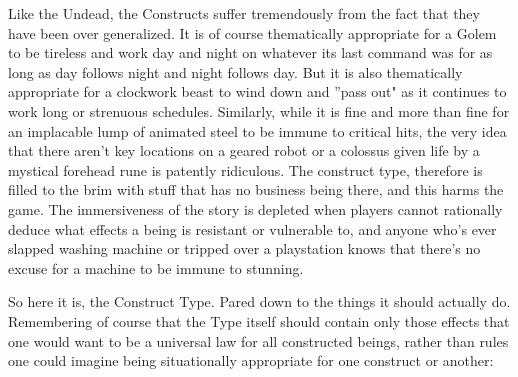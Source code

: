 Like the Undead, the Constructs suffer tremendously from the fact that they have been over generalized. It is of course thematically appropriate for a Golem to be tireless and work day and night on whatever its last command was for as long as day follows night and night follows day. But it is also thematically appropriate for a clockwork beast to wind down and ''pass out" as it continues to work long or strenuous schedules. Similarly, while it is fine and more than fine for an implacable lump of animated steel to be immune to critical hits, the very idea that there aren't key locations on a geared robot or a colossus given life by a mystical forehead rune is patently ridiculous. The construct type, therefore is filled to the brim with stuff that has no business being there, and this harms the game. The immersiveness of the story is depleted when players cannot rationally deduce what effects a being is resistant or vulnerable to, and anyone who's ever slapped washing machine or tripped over a playstation knows that there's no excuse for a machine to be immune to stunning.

So here it is, the Construct Type. Pared down to the things it should actually do. Remembering of course that the Type itself should contain only those effects that one would want to be a universal law for all constructed beings, rather than rules one could imagine being situationally appropriate for one construct or another:

